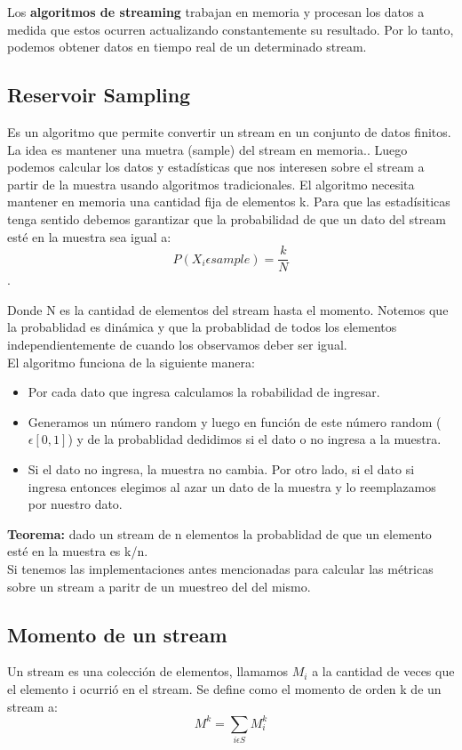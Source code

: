 \documentclass[titlepage,a4paper]{article}
\begin{document}
Los \textbf{algoritmos de streaming} trabajan en memoria y procesan los datos a medida que estos ocurren actualizando constantemente su resultado. Por lo tanto, podemos obtener datos en tiempo real de un determinado stream. 

\subsection*{Reservoir Sampling}
Es un algoritmo que permite convertir un stream en un conjunto de datos finitos. La idea es mantener una muetra (sample) del stream en memoria.. Luego podemos calcular los datos y estadísticas que nos interesen sobre el stream a partir de la muestra usando algoritmos tradicionales. El algoritmo necesita mantener en memoria una cantidad fija de elementos k. Para que las estadísiticas tenga sentido debemos garantizar que la probabilidad de que un dato del stream esté en la muestra sea igual a: $$P(X_i \epsilon sample) = \frac{k}{N}$$. 

Donde N es la cantidad de elementos del  stream hasta el momento. Notemos que la probablidad es dinámica y que la probablidad de todos los elementos independientemente de cuando los observamos deber ser igual. \\

El algoritmo funciona de la siguiente manera: 
\begin{itemize}
\item Por cada dato que ingresa calculamos la robabilidad de ingresar. 
\item Generamos un número random y luego en función de este número random ($\epsilon[0,1]$) y de la probablidad dedidimos si el dato o no ingresa a la muestra. 
\item Si el dato no ingresa, la muestra no cambia. Por otro lado, si el dato si ingresa entonces elegimos al azar un dato de la muestra y lo reemplazamos por nuestro dato. 
\end{itemize}

\textbf{Teorema:} dado un stream de n elementos la probablidad de que un elemento esté en la muestra es k/n. \\

Si tenemos las implementaciones antes mencionadas para calcular las métricas sobre un stream a paritr de un muestreo del del mismo. 

\subsection*{Momento de un stream}
Un stream es una colección de elementos,  llamamos $M_i$ a la cantidad de veces que el elemento i ocurrió en el stream. Se define como el momento de orden k de un stream a: $$M^k = \sum_{i\epsilon S} M_i^k$$
\end{document}
